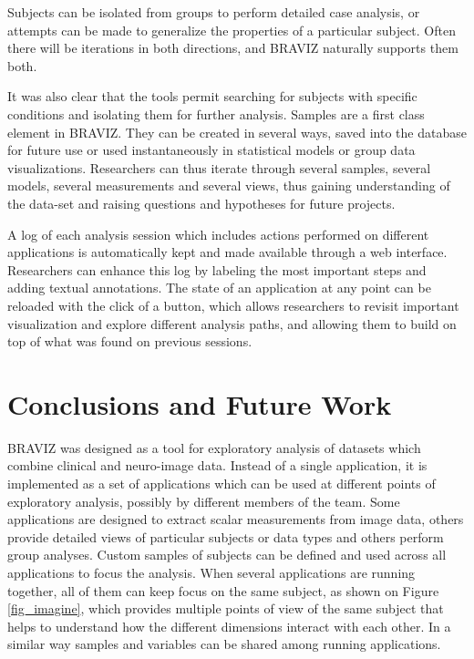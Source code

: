 \documentclass[twocolumn]{svjour3}
\begin{document}
Subjects can be isolated from groups to perform detailed case analysis, or attempts can be made to generalize the properties of a particular subject. Often there will be iterations in both directions, and BRAVIZ naturally supports them both.

It was also clear that the tools permit searching for subjects with specific conditions and isolating them for further analysis.
Samples are a first class element in BRAVIZ. They can be created in several ways, saved into the database for future use or used instantaneously in statistical models or group data visualizations. Researchers can thus iterate through several samples, several models, several measurements and several views, thus gaining understanding of the data-set and raising questions and hypotheses for future projects.

A log of each analysis session which includes actions performed on different applications is automatically kept and made available through a web interface. Researchers can enhance this log by labeling the most important steps and adding textual annotations. The state of an application at any point can be reloaded with the click of a button, which allows researchers to revisit important visualization and explore different analysis paths, and allowing them to build on top of what was found on previous sessions. 

\section{Conclusions and Future Work}

BRAVIZ was designed as a tool for exploratory analysis of datasets which combine clinical and neuro-image data. Instead of a single application, it is implemented as a set of applications which can be used at different points of exploratory analysis, possibly by different members of the team. Some applications are designed to extract scalar measurements from image data, others provide detailed views of particular subjects or data types and others perform group analyses. Custom samples of subjects can be defined and used across all applications to focus the analysis. When several applications are running together, all of them can keep focus on the same subject, as shown on Figure \ref{fig_imagine}, which provides multiple points of view of the same subject that helps to understand how the different dimensions interact with each other. In a similar way samples and variables can be shared among running applications.
\end{document}
